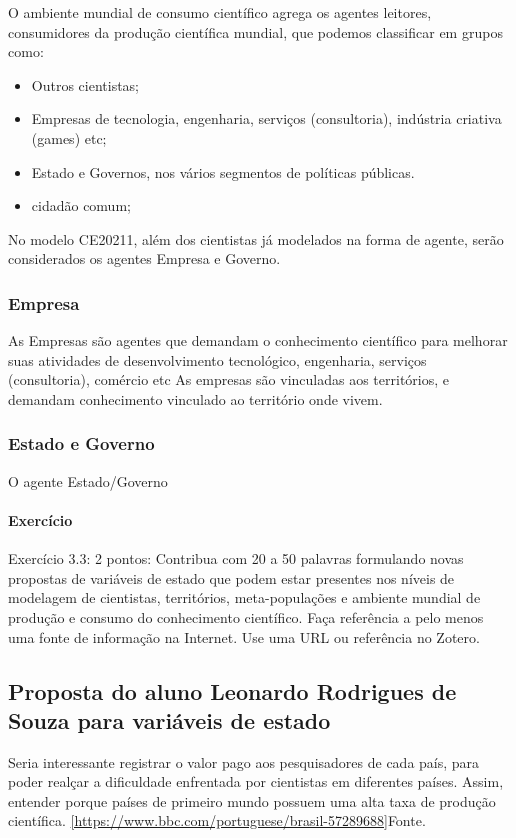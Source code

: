O ambiente mundial de consumo científico agrega os agentes leitores, consumidores da produção científica mundial, que podemos classificar em grupos como:
    \begin{itemize}
            \item Outros cientistas;
            \item Empresas de tecnologia, engenharia, serviços (consultoria), indústria criativa (games) etc;
            \item Estado e Governos, nos vários segmentos de políticas públicas.
            \item cidadão comum;
        \end{itemize}

No modelo CE20211, além dos cientistas já modelados na forma de agente, serão considerados os agentes Empresa e Governo.

\subsubsection{Empresa}
As Empresas são agentes que demandam o conhecimento científico para melhorar suas atividades de desenvolvimento tecnológico, engenharia, serviços (consultoria), comércio etc
As empresas são vinculadas aos territórios, e demandam conhecimento vinculado ao território onde vivem.

\subsubsection{Estado e Governo}
O agente Estado/Governo 


\paragraph{Exercício} Exercício 3.3: 2 pontos:
Contribua com 20 a 50 palavras formulando novas propostas de variáveis de estado que podem estar presentes nos níveis de modelagem de
cientistas, territórios, meta-populações e ambiente mundial de produção e consumo do conhecimento científico.
Faça referência a pelo menos uma fonte de informação na Internet. Use uma URL ou referência no Zotero.

\subsection{Proposta do aluno Leonardo Rodrigues de Souza para variáveis de estado}

Seria interessante registrar o valor pago aos pesquisadores de cada país, para poder realçar a dificuldade enfrentada por cientistas em diferentes países. Assim, entender porque países de primeiro mundo possuem uma alta taxa de produção científica. \ref{https://www.bbc.com/portuguese/brasil-57289688}{Fonte}.

